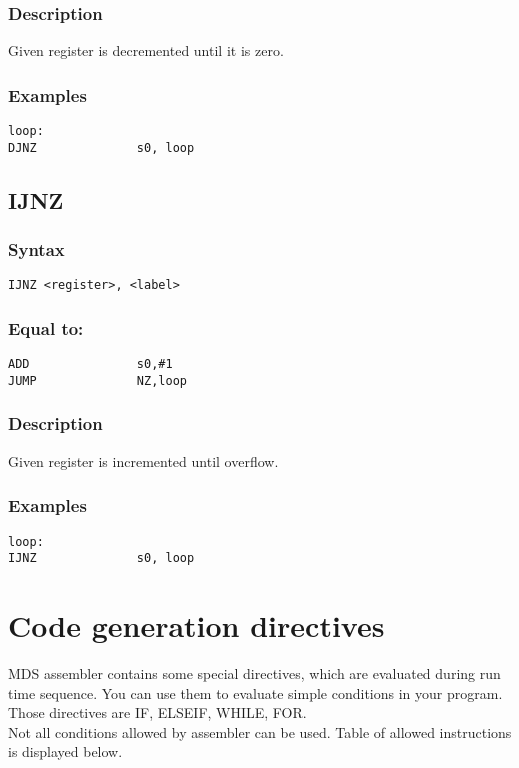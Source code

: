         \subsubsection{Description}
            Given register is decremented until it is zero.

        \subsubsection{Examples}
            \verb'loop:             '\\
            \verb'DJNZ              s0, loop'

    \subsection{IJNZ}
        \subsubsection{Syntax}
            \verb'IJNZ <register>, <label>'

        \subsubsection{Equal to:}
            \verb'ADD               s0,#1'\\
            \verb'JUMP              NZ,loop'

        \subsubsection{Description}
            Given register is incremented until overflow.

        \subsubsection{Examples}
            \verb'loop:             '\\
            \verb'IJNZ              s0, loop'

\section{Code generation directives}
    MDS assembler contains some special directives, which are evaluated during run time sequence. You can use them to evaluate simple conditions in your program. Those directives are IF, ELSEIF, WHILE, FOR.\\ Not all conditions allowed by assembler can be used. Table of allowed instructions is displayed below.

